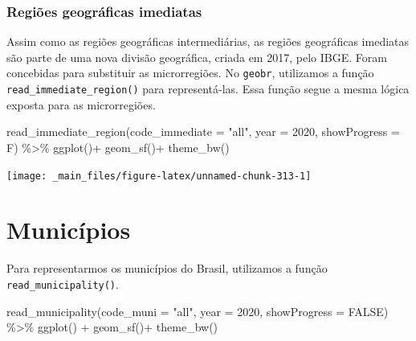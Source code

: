 \documentclass[
  brazilian,
]{book}
\newenvironment{Shaded}{\begin{snugshade}}{\end{snugshade}}
\newcommand{\AttributeTok}[1]{\textcolor[rgb]{0.77,0.63,0.00}{#1}}
\newcommand{\ConstantTok}[1]{\textcolor[rgb]{0.00,0.00,0.00}{#1}}
\newcommand{\DecValTok}[1]{\textcolor[rgb]{0.00,0.00,0.81}{#1}}
\newcommand{\FunctionTok}[1]{\textcolor[rgb]{0.00,0.00,0.00}{#1}}
\newcommand{\NormalTok}[1]{#1}
\newcommand{\SpecialCharTok}[1]{\textcolor[rgb]{0.00,0.00,0.00}{#1}}
\newcommand{\StringTok}[1]{\textcolor[rgb]{0.31,0.60,0.02}{#1}}
\begin{document}
\hypertarget{regiuxf5es-geogruxe1ficas-imediatas}{%
\subsubsection{Regiões geográficas imediatas}\label{regiuxf5es-geogruxe1ficas-imediatas}}

Assim como as regiões geográficas intermediárias, as regiões geográficas imediatas são parte de uma nova divisão geográfica, criada em 2017, pelo IBGE. Foram concebidas para substituir as microrregiões. No \texttt{geobr}, utilizamos a função \texttt{read\_immediate\_region()} para representá-las. Essa função segue a mesma lógica exposta para as microrregiões.

\begin{Shaded}
\begin{Highlighting}[]
\FunctionTok{read\_immediate\_region}\NormalTok{(}\AttributeTok{code\_immediate =} \StringTok{"all"}\NormalTok{,}
                      \AttributeTok{year =} \DecValTok{2020}\NormalTok{,}
                      \AttributeTok{showProgress =}\NormalTok{ F) }\SpecialCharTok{\%\textgreater{}\%} 
  \FunctionTok{ggplot}\NormalTok{()}\SpecialCharTok{+}
  \FunctionTok{geom\_sf}\NormalTok{()}\SpecialCharTok{+}
  \FunctionTok{theme\_bw}\NormalTok{()}
\end{Highlighting}
\end{Shaded}

\begin{center}\texttt{[image: \_main\_files/figure-latex/unnamed-chunk-313-1]} \end{center}

\hypertarget{municuxedpios}{%
\section{Municípios}\label{municuxedpios}}

Para representarmos os municípios do Brasil, utilizamos a função \texttt{read\_municipality()}.

\begin{Shaded}
\begin{Highlighting}[]
\FunctionTok{read\_municipality}\NormalTok{(}\AttributeTok{code\_muni =} \StringTok{"all"}\NormalTok{,}
                  \AttributeTok{year =} \DecValTok{2020}\NormalTok{,}
                  \AttributeTok{showProgress =} \ConstantTok{FALSE}\NormalTok{) }\SpecialCharTok{\%\textgreater{}\%} 
  \FunctionTok{ggplot}\NormalTok{() }\SpecialCharTok{+}
  \FunctionTok{geom\_sf}\NormalTok{()}\SpecialCharTok{+}
  \FunctionTok{theme\_bw}\NormalTok{()}
\end{Highlighting}
\end{Shaded}
\end{document}
